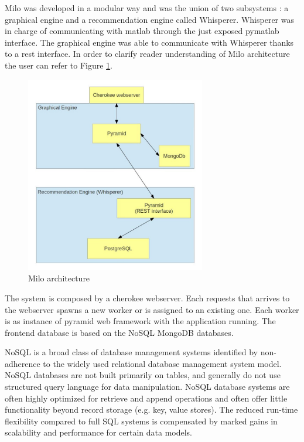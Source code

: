 Milo was developed in a modular way and was the union of two subsystems \cite{thesis-andreia}: a graphical engine and a recommendation engine called Whisperer. Whisperer was in charge of communicating with matlab through the just exposed pymatlab interface. The graphical engine was able to communicate with Whisperer thanks to a rest interface. In order to clarify reader understanding of Milo architecture the user can refer to Figure \ref{fig:milo_architecture}.

\begin{figure}
  \centering
  \includegraphics[width=0.7\textwidth]{figures/milo_architecture.jpg}
  \caption{Milo architecture}
  \label{fig:milo_architecture}
\end{figure}

The system is composed by a cherokee webserver. Each requests that arrives to the webserver spawns a new worker or is assigned to an existing one. Each worker is as instance of pyramid web framework with the application running. The frontend database is based on the NoSQL \cite{nosql} MongoDB \cite{mongodb} databases.

NoSQL is a broad class of database management systems identified by non-adherence to the widely used relational database management system model. NoSQL databases are not built primarily on tables, and generally do not use structured query language for data manipulation. NoSQL database systems are often highly optimized for retrieve and append operations and often offer little functionality beyond record storage (e.g. key, value stores). The reduced run-time flexibility compared to full SQL systems is compensated by marked gains in scalability and performance for certain data models. 

